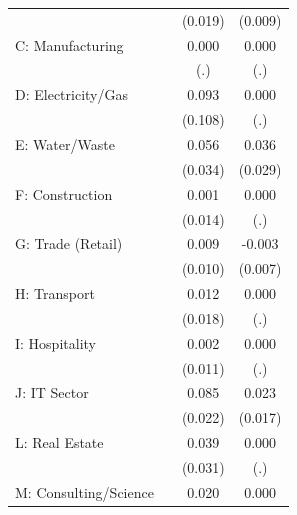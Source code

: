 \begin{table}[htbp]
\begin{tabular}{l*{3}{c}}
                    &                     &     (0.019)         &     (0.009)         \\
\addlinespace
C: Manufacturing    &                     &       0.000         &       0.000         \\
                    &                     &         (.)         &         (.)         \\
\addlinespace
D: Electricity/Gas  &                     &       0.093         &       0.000         \\
                    &                     &     (0.108)         &         (.)         \\
\addlinespace
E: Water/Waste      &                     &       0.056         &       0.036         \\
                    &                     &     (0.034)         &     (0.029)         \\
\addlinespace
F: Construction     &                     &       0.001         &       0.000         \\
                    &                     &     (0.014)         &         (.)         \\
\addlinespace
G: Trade (Retail)   &                     &       0.009         &      -0.003         \\
                    &                     &     (0.010)         &     (0.007)         \\
\addlinespace
H: Transport        &                     &       0.012         &       0.000         \\
                    &                     &     (0.018)         &         (.)         \\
\addlinespace
I: Hospitality      &                     &       0.002         &       0.000         \\
                    &                     &     (0.011)         &         (.)         \\
\addlinespace
J: IT Sector        &                     &       0.085\sym{***}&       0.023         \\
                    &                     &     (0.022)         &     (0.017)         \\
\addlinespace
L: Real Estate      &                     &       0.039         &       0.000         \\
                    &                     &     (0.031)         &         (.)         \\
\addlinespace
M: Consulting/Science&                     &       0.020         &       0.000         \\

\end{tabular}
\end{table}
